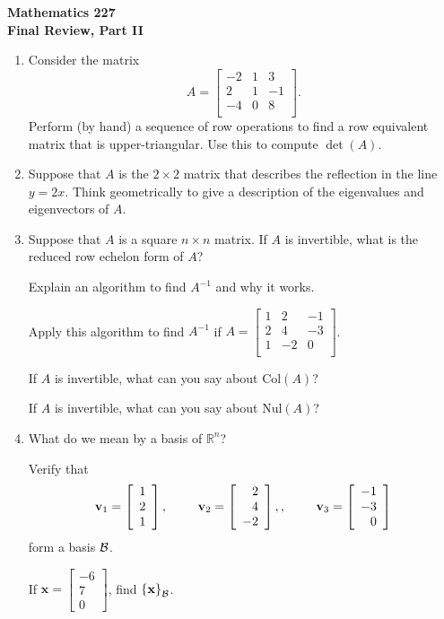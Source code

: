 \documentclass[12pt]{article}
\newcommand{\vs}[1]{\vspace{#1in}}
\newcommand{\vvec}{{\mathbf v}}
\newcommand{\xvec}{{\mathbf x}}
\newcommand{\real}{{\mathbb R}}
\newcommand{\threevec}[3]{\left[\begin{array}{r}#1 \\ #2 \\ #3
  \end{array}\right]}
\newcommand{\bcal}{{\cal B}}
\newcommand{\coords}[2]{\left\{#1\right\}_{#2}}
\newcommand{\col}{\text{Col}}
\newcommand{\nul}{\text{Nul}}
\begin{document}
\noindent
{\bf Mathematics 227} \\ 
{\bf Final Review, Part II}

\begin{enumerate}
\item Consider the matrix
  $$
  A =
  \left[
    \begin{array}{ccc}
      -2 & 1 & 3 \\
      2 & 1 & -1 \\
      -4 & 0 & 8 \\
    \end{array}
  \right].
  $$
  Perform (by hand) a sequence of row operations to find a row
  equivalent matrix that is upper-triangular.  Use this to compute
  $\det(A)$.

  \vs{4}
    
\item Suppose that $A$ is the $2\times2$ matrix that describes the
  reflection in the line $y=2x$.  Think geometrically to give a
  description of the eigenvalues and eigenvectors of $A$.

  \vs{1.15}
\item Suppose that $A$ is a square $n\times n$ matrix.  If $A$ is
  invertible, what is the reduced row echelon form of $A$?

  \vs{1}
  Explain an algorithm to find $A^{-1}$ and why it works.

  \vs{1}
  Apply this algorithm to find $A^{-1}$ if
  $
  A =
  \left[
    \begin{array}{ccc}
      1 & 2 & -1 \\
      2 & 4 & -3 \\
      1 & -2 & 0 \\
    \end{array}
  \right]
  $.

  \vs{1}
  If $A$ is invertible, what can you say about $\col(A)$?

  \vs{1}
  If $A$ is invertible, what can you say about $\nul(A)$?

  \vs{1}
\item What do we mean by a basis of $\real^n$?

  \vs{1}
  Verify that
  $$
  \vvec_1=\threevec121,\hspace*{24pt}
  \vvec_2=\threevec24{-2},,\hspace*{24pt}
  \vvec_3=\threevec{-1}{-3}0
  $$
  form a basis $\bcal$.

  \vs{1}
  If $\xvec= \threevec{-6}70$, find $\coords{\xvec}{\bcal}$.


\end{enumerate}
\end{document}
